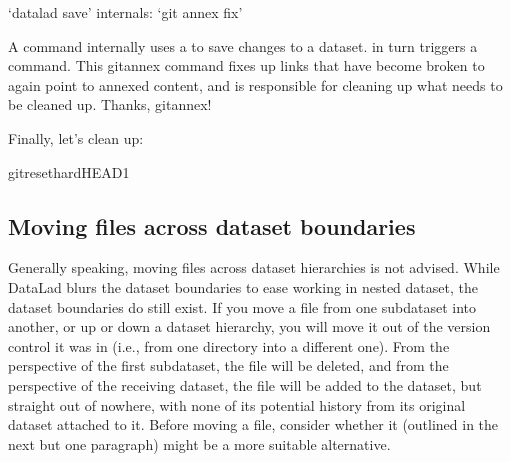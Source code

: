 \ignorespaces \begin{gitusernote}[label={index-3}, before title={\thetcbcounter\ }, check odd page=true]{‘datalad save’ internals: ‘git annex fix’}
\label{\detokenize{basics/101-136-filesystem:index-3}}

\sphinxAtStartPar
A  command internally uses a  to save changes to a dataset.
 in turn triggers a 
command. This git\sphinxhyphen{}annex command fixes up links that have become broken
to again point to annexed content, and is responsible for cleaning up
what needs to be cleaned up. Thanks, git\sphinxhyphen{}annex!


\end{gitusernote}

\sphinxAtStartPar
Finally, let’s clean up:

\begin{sphinxVerbatim}[commandchars=\\\{\}]
gitreset\PYGZhy{}\PYGZhy{}hardHEAD\PYGZti{}1
\end{sphinxVerbatim}

\ignorespaces 

\subsection{Moving files across dataset boundaries}
\label{\detokenize{basics/101-136-filesystem:moving-files-across-dataset-boundaries}}\label{\detokenize{basics/101-136-filesystem:index-4}}
\sphinxAtStartPar
Generally speaking, moving files across dataset hierarchies is not advised.
While DataLad blurs the dataset boundaries to ease working in nested dataset,
the dataset boundaries do still exist. If you move a file from one subdataset
into another, or up or down a dataset hierarchy, you will move it out of the
version control it was in (i.e., from one  directory into a different
one). From the perspective of the first subdataset, the file will be deleted,
and from the perspective of the receiving dataset, the file will be added to
the dataset, but straight out of nowhere, with none of its potential history
from its original dataset attached to it. Before moving a file, consider whether
 it (outlined in the next but one paragraph) might be a more suitable
alternative.

